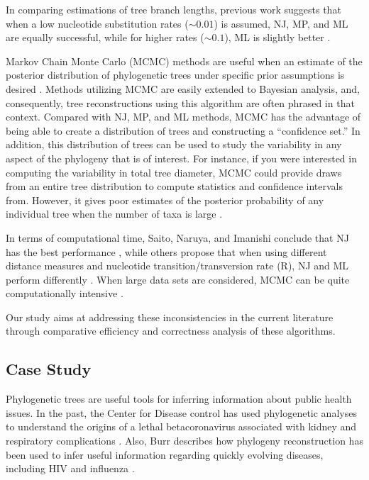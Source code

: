 \documentclass[10pt,twocolumn]{article}
\begin{document}
In comparing estimations of tree branch lengths, previous work suggests that when a low nucleotide substitution rates ($\sim 0.01$) is assumed, NJ, MP, and ML are equally successful, while for higher rates ($\sim 0.1$), ML is slightly better \cite{kuhner1994simulation}.

Markov Chain Monte Carlo (MCMC) methods are useful when an estimate of the posterior distribution of phylogenetic trees under specific prior assumptions is desired \cite{salter2000algorithms}. Methods utilizing MCMC are easily extended to Bayesian analysis, and, consequently, tree reconstructions using this algorithm are often phrased in that context. Compared with NJ, MP, and ML methods, MCMC has the advantage of being able to create a distribution of trees and constructing a ``confidence set.'' In addition, this distribution of trees can be used to study the variability in any aspect of the phylogeny that is of interest. For instance, if you were interested in computing the variability in total tree diameter, MCMC could provide draws from an entire tree distribution to compute statistics and confidence intervals from. However, it gives poor estimates of the posterior probability of any individual tree when the number of taxa is large \cite{salter2000algorithms}. 

In terms of computational time, Saito, Naruya, and 
Imanishi conclude that NJ has the best performance \cite{saitou1989relative}, 
while others propose that when using different distance measures and nucleotide transition/transversion rate (R), NJ and ML perform differently \cite{tateno1994relative}. When large data sets are considered, MCMC can be quite computationally intensive \cite{salter2000algorithms}.

Our study aims at addressing these inconsistencies in the current literature
through comparative efficiency and correctness analysis of these algorithms.

\subsection*{Case Study}
Phylogenetic trees are useful tools for inferring information about
public health issues.
In the past, the Center for Disease control has used phylogenetic
analyses to understand the origins of a lethal betacoronavirus associated with
kidney and respiratory complications \cite{cotten2013full}. Also, Burr describes how phylogeny
reconstruction has been used to infer useful information regarding quickly evolving diseases,
including HIV and influenza \cite{burrpredict}.
\end{document}
